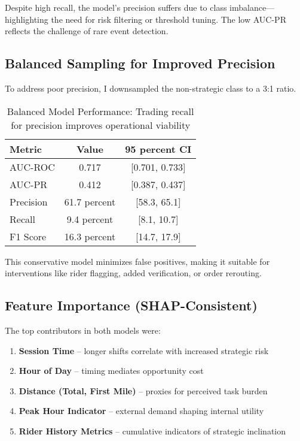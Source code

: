 \documentclass[12pt,letterpaper]{article}
\begin{document}
Despite high recall, the model's precision suffers due to class imbalance—highlighting the need for risk filtering or threshold tuning. The low AUC-PR reflects the challenge of rare event detection.

\subsection{Balanced Sampling for Improved Precision}

To address poor precision, I downsampled the non-strategic class to a 3:1 ratio.

\begin{table}[H]
\centering
\caption{Balanced Model Performance: Trading recall for precision improves operational viability}
\label{tab:balanced_model_performance}
\begin{tabular}{lcc}
\toprule
Metric & Value & 95 percent CI \\
\midrule
AUC-ROC & 0.717 & [0.701, 0.733] \\
AUC-PR & 0.412 & [0.387, 0.437] \\
Precision & 61.7 percent & [58.3, 65.1] \\
Recall & 9.4 percent & [8.1, 10.7] \\
F1 Score & 16.3 percent & [14.7, 17.9] \\
\bottomrule
\end{tabular}
\end{table}

This conservative model minimizes false positives, making it suitable for interventions like rider flagging, added verification, or order rerouting.

\subsection{Feature Importance (SHAP-Consistent)}

The top contributors in both models were:

\begin{enumerate}
    \item \textbf{Session Time} -- longer shifts correlate with increased strategic risk
    \item \textbf{Hour of Day} -- timing mediates opportunity cost
    \item \textbf{Distance (Total, First Mile)} -- proxies for perceived task burden
    \item \textbf{Peak Hour Indicator} -- external demand shaping internal utility
    \item \textbf{Rider History Metrics} -- cumulative indicators of strategic inclination
\end{enumerate}
\end{document}
